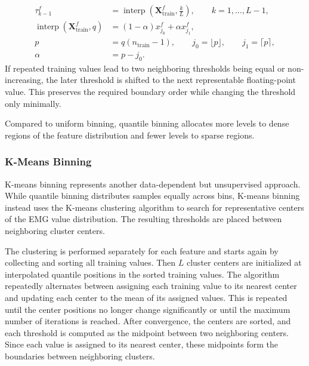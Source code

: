                 \begin{equation}
                \begin{aligned}
                \tau^f_{k-1}
                &=
                \operatorname{interp}
                \left(
                \mathbf{X}^f_{\mathrm{train}},
                \frac{k}{L}
                \right),
                \qquad
                k=1,\ldots,L-1,
                \\[0.5em]
                \operatorname{interp}
                \left(
                \mathbf{X}^f_{\mathrm{train}},
                q
                \right)
                &=
                (1-\alpha)x^f_{j_0} + \alpha x^f_{j_1},
                \\[0.5em]
                p
                &=
                q(n_{\mathrm{train}}-1),
                \qquad
                j_0=\lfloor p \rfloor,
                \qquad
                j_1=\lceil p \rceil,
                \\
                \alpha
                &=
                p-j_0.
                \end{aligned}
                \label{eq:quantile_binning_boundary}
                \end{equation}
           If repeated training values lead to two neighboring thresholds being equal or non-increasing, the later threshold is shifted to the next representable floating-point value. This preserves the required boundary order while changing the threshold only minimally. 
           
           Compared to uniform binning, quantile binning allocates more levels to dense regions of the feature distribution and fewer levels to sparse regions. 
           
        \subsubsection{K-Means Binning}
        \label{sec:K-meansBinning}

        K-means binning represents another data-dependent but unsupervised approach. While quantile binning distributes samples equally across bins, K-means binning instead uses the K-means clustering algorithm to search for representative centers of the EMG value distribution. The resulting thresholds are placed between neighboring cluster centers. 

        The clustering is performed separately for each feature and starts again by collecting and sorting all training values. Then $L$ cluster centers are initialized at interpolated quantile positions in the sorted training values. The algorithm repeatedly alternates between assigning each training value to its nearest center and updating each center to the mean of its assigned values. This is repeated until the center positions no longer change significantly or until the maximum number of iterations is reached. After convergence, the centers are sorted, and each threshold is computed as the midpoint between two neighboring centers. Since each value is assigned to its nearest center, these midpoints form the boundaries between neighboring clusters.

